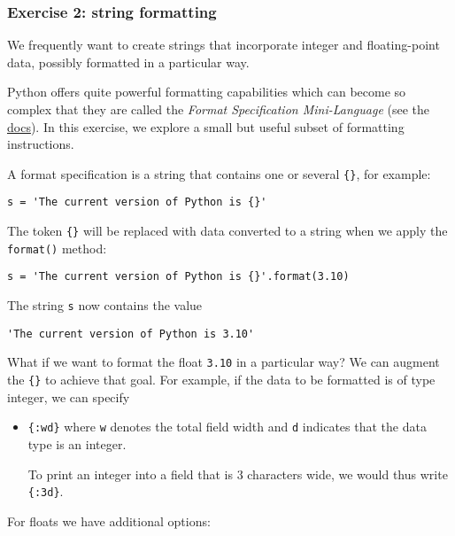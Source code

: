 \documentclass{scrartcl}
\begin{document}
    \hypertarget{exercise-2-string-formatting}{%
\subsubsection{Exercise 2: string
formatting}\label{exercise-2-string-formatting}}

We frequently want to create strings that incorporate integer and
floating-point data, possibly formatted in a particular way.

Python offers quite powerful formatting capabilities which can become so
complex that they are called the \emph{Format Specification
Mini-Language} (see the
\href{https://docs.python.org/3/library/string.html\#format-specification-mini-language}{docs}).
In this exercise, we explore a small but useful subset of formatting
instructions.

A format specification is a string that contains one or several
\texttt{\{\}}, for example:

\begin{verbatim}
s = 'The current version of Python is {}'
\end{verbatim}

The token \texttt{\{\}} will be replaced with data converted to a string
when we apply the \texttt{format()} method:

\begin{verbatim}
s = 'The current version of Python is {}'.format(3.10)
\end{verbatim}

The string \texttt{s} now contains the value

\begin{verbatim}
'The current version of Python is 3.10'
\end{verbatim}

What if we want to format the float \texttt{3.10} in a particular way?
We can augment the \texttt{\{\}} to achieve that goal. For example, if
the data to be formatted is of type integer, we can specify

\begin{itemize}
\item
  \texttt{\{:wd\}} where \texttt{w} denotes the total field width and
  \texttt{d} indicates that the data type is an integer.

  To print an integer into a field that is 3 characters wide, we would
  thus write \texttt{\{:3d\}}.
\end{itemize}

For floats we have additional options:
\end{document}
